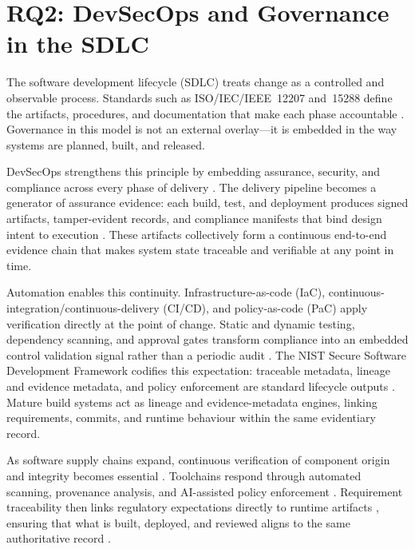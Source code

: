 \section{RQ2: DevSecOps and Governance in the SDLC}

The software development lifecycle (SDLC) treats change as a controlled and
observable process. Standards such as ISO/IEC/IEEE~12207 and~15288 define the
artifacts, procedures, and documentation that make each phase accountable
\cite{noauthor_isoiecieee_2019, hernandez_requirements_2023}. Governance in
this model is not an external overlay—it is embedded in the way systems are
planned, built, and released.

DevSecOps strengthens this principle by embedding assurance, security, and
compliance across every phase of delivery
\cite{souppaya_secure_2022, anisetti_devsecops-based_2022}. The delivery
pipeline becomes a generator of assurance evidence: each build, test, and
deployment produces signed artifacts, tamper-evident records, and compliance
manifests that bind design intent to execution
\cite{anisetti_devsecops-based_2022, anisetti_semi-automatic_2020,
chen_design_2022, weigand_auditability_2019}. These artifacts collectively form
a continuous end-to-end evidence chain that makes system state traceable and
verifiable at any point in time.

Automation enables this continuity. Infrastructure-as-code (IaC),
continuous-integration/continuous-delivery (CI/CD), and policy-as-code (PaC)
apply verification directly at the point of change. Static and dynamic testing,
dependency scanning, and approval gates transform compliance into an embedded
control validation signal rather than a periodic audit
\cite{li_evolution_2025, anisetti_semi-automatic_2020,
hernandez_requirements_2023}. The NIST Secure Software Development Framework
codifies this expectation: traceable metadata, lineage and evidence metadata,
and policy enforcement are standard lifecycle outputs \cite{souppaya_secure_2022}.
Mature build systems act as lineage and evidence-metadata engines, linking
requirements, commits, and runtime behaviour within the same evidentiary record.

As software supply chains expand, continuous verification of component origin
and integrity becomes essential \cite{li_evolution_2025, souppaya_secure_2022}.
Toolchains respond through automated scanning, provenance analysis, and
AI-assisted policy enforcement \cite{mittal_practical_2025,
achuthan_shifting_2024}. Requirement traceability then links regulatory
expectations directly to runtime artifacts \cite{noauthor_isoiecieee_2019,
chen_design_2022}, ensuring that what is built, deployed, and reviewed aligns to
the same authoritative record \cite{elbaghazaoui_integrating_2025-1}.

